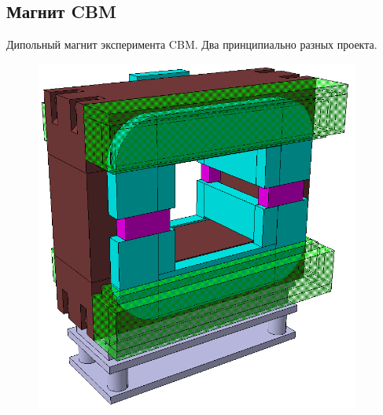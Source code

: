
\subsection{Магнит CBM}\label{sec:secCbmMagnet}

Дипольный магнит эксперимента CBM.
Два принципиально разных проекта.

\begin{figure}[H]
\begin{minipage}[b]{0.495\textwidth}
\includegraphics[width=0.95\textwidth]{pictures/Old_magnet_2.png}
\caption{}
\label{fig:OldCbmMagnet1}
\end{minipage}
\hspace{0.01\textwidth}
\begin{minipage}[b]{0.495\textwidth}

\end{minipage}
\end{figure}
